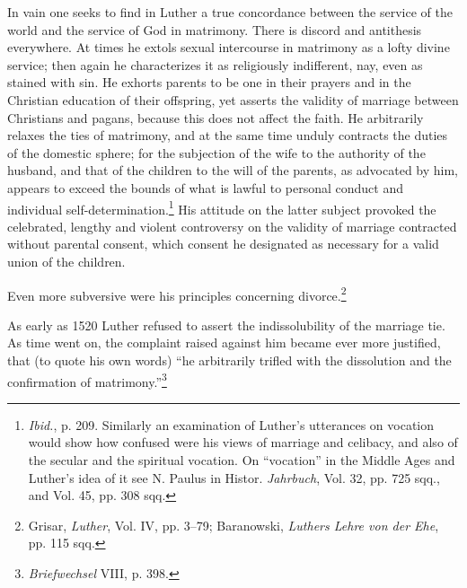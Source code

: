 In vain one seeks to find in Luther a true concordance between the
service of the world and the service of God in matrimony. There is
discord and antithesis everywhere. At times he extols sexual intercourse
in matrimony as a lofty divine service; then again he characterizes it
as religiously indifferent, nay, even as stained with sin. He exhorts
parents to be one in their prayers and in the Christian education
of their offspring, yet asserts the validity of marriage between Christians
and pagans, because this does not affect the faith. He arbitrarily
relaxes the ties of matrimony, and at the same time unduly contracts
the duties of the domestic sphere; for the subjection of the wife to
the authority of the husband, and that of the children to the will of
the parents, as advocated by him, appears to exceed the bounds of
what is lawful to personal conduct and individual self-determination.\footnote
{\textit{Ibid.}, p. 209. Similarly an examination of Luther’s utterances on vocation would
show how confused were his views of marriage and celibacy, and also of the secular and
the spiritual vocation. On “vocation” in the Middle Ages and Luther’s idea of it see
N. Paulus in Histor. \textit{Jahrbuch}, Vol. 32, pp. 725 sqq., and Vol. 45, pp. 308 sqq.}
His attitude on the latter subject provoked the celebrated,
lengthy and violent controversy on the validity of marriage contracted
without parental consent, which consent he designated as
necessary for a valid union of the children.

Even more subversive were his principles concerning divorce.\footnote
{Grisar, \textit{Luther}, Vol. IV, pp. 3--79; Baranowski, \textit{Luthers Lehre von der Ehe}, pp. 115 sqq.}

As early as 1520 Luther refused to assert the indissolubility of the
marriage tie. As time went on, the complaint raised against him became
ever more justified, that (to quote his own words) “he arbitrarily trifled
with the dissolution and the confirmation of matrimony.”\footnote{\textit{Briefwechsel} VIII, p. 398.}

